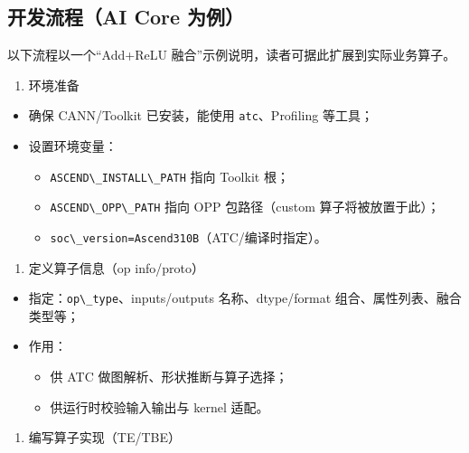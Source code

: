\subsection{开发流程（AI Core
为例）}\label{ux5f00ux53d1ux6d41ux7a0bai-core-ux4e3aux4f8b}

以下流程以一个``Add+ReLU 融合''示例说明，读者可据此扩展到实际业务算子。

\begin{enumerate}
\def\labelenumi{\arabic{enumi})}
\tightlist
\item
  环境准备
\end{enumerate}

\begin{itemize}
\tightlist
\item
  确保 CANN/Toolkit 已安装，能使用
  \passthrough{\lstinline!atc!}、Profiling 等工具；
\item
  设置环境变量：

  \begin{itemize}
  \tightlist
  \item
    \passthrough{\lstinline!ASCEND\_INSTALL\_PATH!} 指向 Toolkit 根；
  \item
    \passthrough{\lstinline!ASCEND\_OPP\_PATH!} 指向 OPP 包路径（custom
    算子将被放置于此）；
  \item
    \passthrough{\lstinline!soc\_version=Ascend310B!}（ATC/编译时指定）。
  \end{itemize}
\end{itemize}

\begin{enumerate}
\def\labelenumi{\arabic{enumi})}
\setcounter{enumi}{1}
\tightlist
\item
  定义算子信息（op info/proto）
\end{enumerate}

\begin{itemize}
\tightlist
\item
  指定：\passthrough{\lstinline!op\_type!}、inputs/outputs
  名称、dtype/format 组合、属性列表、融合类型等；
\item
  作用：

  \begin{itemize}
  \tightlist
  \item
    供 ATC 做图解析、形状推断与算子选择；
  \item
    供运行时校验输入输出与 kernel 适配。
  \end{itemize}
\end{itemize}

\begin{enumerate}
\def\labelenumi{\arabic{enumi})}
\setcounter{enumi}{2}
\tightlist
\item
  编写算子实现（TE/TBE）
\end{enumerate}

